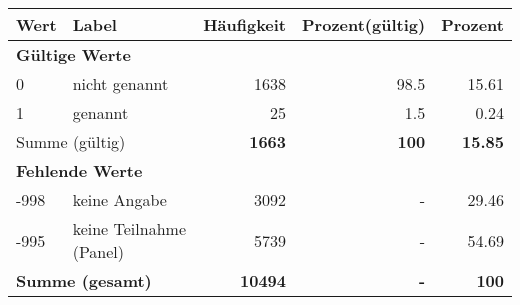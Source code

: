      \begin{longtable}{lXrrr}
     \toprule
     \textbf{Wert} & \textbf{Label} & \textbf{Häufigkeit} & \textbf{Prozent(gültig)} & \textbf{Prozent} \\
     \endhead
     \midrule
     \multicolumn{5}{l}{\textbf{Gültige Werte}}\\

     0 &
     \multicolumn{1}{X}{ nicht genannt   } &


       \num{1638} &
       \num[round-mode=places,round-precision=2]{98,5} &
         \num[round-mode=places,round-precision=2]{15,61} \\

     1 &
     \multicolumn{1}{X}{ genannt   } &


       \num{25} &
       \num[round-mode=places,round-precision=2]{1,5} &
         \num[round-mode=places,round-precision=2]{0,24} \\
     \midrule
     \multicolumn{2}{l}{Summe (gültig)} &
       \textbf{\num{1663}} &
     \textbf{100} &
       \textbf{\num[round-mode=places,round-precision=2]{15,85}} \\
     \multicolumn{5}{l}{\textbf{Fehlende Werte}}\\
       -998 &
       keine Angabe &
         \num{3092} &
        - &
         \num[round-mode=places,round-precision=2]{29,46} \\
       -995 &
       keine Teilnahme (Panel) &
         \num{5739} &
        - &
         \num[round-mode=places,round-precision=2]{54,69} \\
     \midrule
     \multicolumn{2}{l}{\textbf{Summe (gesamt)}} &
          \textbf{\num{10494}} &
        \textbf{-} &
        \textbf{100} \\
     \bottomrule
     \end{longtable}
     
